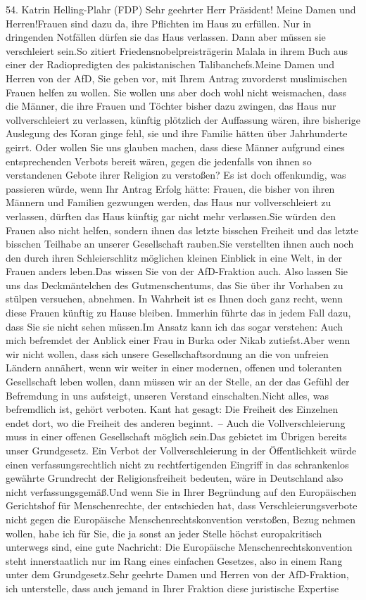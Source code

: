 \documentclass{article}
\begin{document}
	54. Katrin Helling-Plahr (FDP) Sehr geehrter Herr Präsident! Meine Damen und Herren!Frauen sind dazu da, ihre Pflichten im Haus zu erfüllen. Nur in dringenden Notfällen dürfen sie das Haus verlassen. Dann aber müssen sie verschleiert sein.So zitiert Friedensnobelpreisträgerin Malala in ihrem Buch aus einer der Radiopredigten des pakistanischen Talibanchefs.Meine Damen und Herren von der AfD, Sie geben vor, mit Ihrem Antrag zuvorderst muslimischen Frauen helfen zu wollen. Sie wollen uns aber doch wohl nicht weismachen, dass die Männer, die ihre Frauen und Töchter bisher dazu zwingen, das Haus nur vollverschleiert zu verlassen, künftig plötzlich der Auffassung wären, ihre bisherige Auslegung des Koran ginge fehl, sie und ihre Familie hätten über Jahrhunderte geirrt. Oder wollen Sie uns glauben machen, dass diese Männer aufgrund eines entsprechenden Verbots bereit wären, gegen die jedenfalls von ihnen so verstandenen Gebote ihrer Religion zu verstoßen? Es ist doch offenkundig, was passieren würde, wenn Ihr Antrag Erfolg hätte: Frauen, die bisher von ihren Männern und Familien gezwungen werden, das Haus nur vollverschleiert zu verlassen, dürften das Haus künftig gar nicht mehr verlassen.Sie würden den Frauen also nicht helfen, sondern ihnen das letzte bisschen Freiheit und das letzte bisschen Teilhabe an unserer Gesellschaft rauben.Sie verstellten ihnen auch noch den durch ihren Schleierschlitz möglichen kleinen Einblick in eine Welt, in der Frauen anders leben.Das wissen Sie von der AfD-Fraktion auch. Also lassen Sie uns das Deckmäntelchen des Gutmenschentums, das Sie über ihr Vorhaben zu stülpen versuchen, abnehmen. In Wahrheit ist es Ihnen doch ganz recht, wenn diese Frauen künftig zu Hause bleiben. Immerhin führte das in jedem Fall dazu, dass Sie sie nicht sehen müssen.Im Ansatz kann ich das sogar verstehen: Auch mich befremdet der Anblick einer Frau in Burka oder Nikab zutiefst.Aber wenn wir nicht wollen, dass sich unsere Gesellschaftsordnung an die von unfreien Ländern annähert, wenn wir weiter in einer modernen, offenen und toleranten Gesellschaft leben wollen, dann müssen wir an der Stelle, an der das Gefühl der Befremdung in uns aufsteigt, unseren Verstand einschalten.Nicht alles, was befremdlich ist, gehört verboten. Kant hat gesagt: Die Freiheit des Einzelnen endet dort, wo die Freiheit des anderen beginnt. – Auch die Vollverschleierung muss in einer offenen Gesellschaft möglich sein.Das gebietet im Übrigen bereits unser Grundgesetz. Ein Verbot der Vollverschleierung in der Öffentlichkeit würde einen verfassungsrechtlich nicht zu rechtfertigenden Eingriff in das schrankenlos gewährte Grundrecht der Religionsfreiheit bedeuten, wäre in Deutschland also nicht verfassungsgemäß.Und wenn Sie in Ihrer Begründung auf den Europäischen Gerichtshof für Menschenrechte, der entschieden hat, dass Verschleierungsverbote nicht gegen die Europäische Menschenrechtskonvention verstoßen, Bezug nehmen wollen, habe ich für Sie, die ja sonst an jeder Stelle höchst europakritisch unterwegs sind, eine gute Nachricht: Die Europäische Menschenrechtskonvention steht innerstaatlich nur im Rang eines einfachen Gesetzes, also in einem Rang unter dem Grundgesetz.Sehr geehrte Damen und Herren von der AfD-Fraktion, ich unterstelle, dass auch jemand in Ihrer Fraktion diese juristische Expertise 
\end{document}
